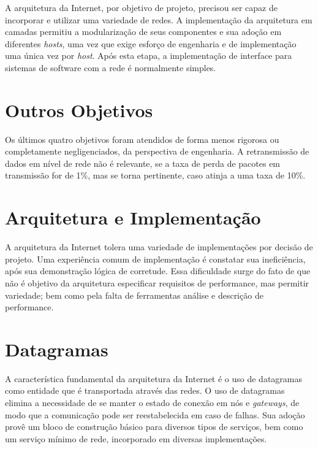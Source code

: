 A arquitetura da Internet, por objetivo de projeto, precisou ser capaz de incorporar e utilizar uma variedade de redes. A implementação da arquitetura em camadas permitiu a modularização de seus componentes e sua adoção em diferentes \textit{hosts}, uma vez que exige esforço de engenharia e de implementação uma única vez por \textit{host}. Após esta etapa, a implementação de interface para sistemas de software com a rede é normalmente simples.


\section*{Outros Objetivos}

Os últimos quatro objetivos foram atendidos de forma menos rigorosa ou completamente negligenciados, da perspectiva de engenharia. A retransmissão de dados em nível de rede não é relevante, se a taxa de perda de pacotes em transmissão for de 1\%, mas se torna pertinente, caso atinja a uma taxa de 10\%.


\section*{Arquitetura e Implementação}

A arquitetura da Internet tolera uma variedade de implementações por decisão de projeto. Uma experiência comum de implementação é constatar sua ineficiência, após sua demonstração lógica de corretude. Essa dificuldade surge do fato de que não é objetivo da arquitetura especificar requisitos de performance, mas permitir variedade; bem como pela falta de ferramentas análise e descrição de performance.


\section*{Datagramas}

A característica fundamental da arquitetura da Internet é o uso de datagramas como entidade que é transportada através das redes. O uso de datagramas elimina a necessidade de se manter o estado de conexão em nós e \textit{gateways}, de modo que a comunicação pode ser reestabelecida em caso de falhas. Sua adoção provê um bloco de construção básico para diversos tipos de serviços, bem como um serviço mínimo de rede, incorporado em diversas implementações.


